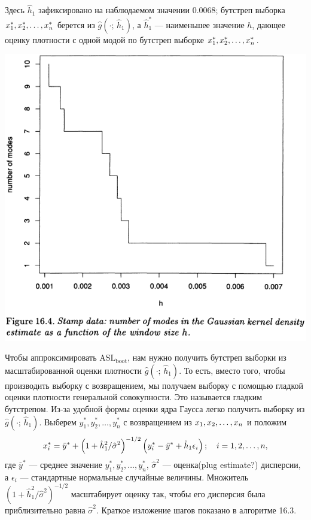 Здесь $\hat{h}_1$ зафиксировано на наблюдаемом значении $0.0068$; бутстреп выборка $x_1^*,x_2^*,\ldots,x_{n}^*$ берется из $\hat{g}(\cdot;\, \hat{h}_1)$, а $\hat{h}^{*}_1$ --- наименьшее значение $h$, дающее оценку плотности с одной модой по бутстреп выборке $x_1^*,x_2^*,\ldots,x_{n}^*$.

\newpage
\noindent
\includegraphics[width=\linewidth]{16/f16.4.png}

Чтобы аппроксимировать $\text{ASL}_{\text{boot}}$, нам нужно получить бутстреп выборки из масштабированной оценки плотности $\hat{g}(\cdot;\, \hat{h}_1)$. То есть, вместо того, чтобы производить выборку с возвращением, мы получаем выборку с помощью гладкой оценки плотности генеральной совокупности. Это называется гладким бутстрепом. Из-за удобной формы оценки ядра Гаусса легко получить выборку из $\hat{g}(\cdot;\, \hat{h}_1)$. Выберем $y^{*}_1, y^{*}_2, \ldots, y^{*}_n$ с возвращением из $x_1,x_2,\ldots,x_{n}$ и положим
\begin{equation}\label{eq16.22}
    x^{*}_i = \bar{y}^{*} + \left(1+\hat{h}^2_1/\hat{\sigma}^2\right)^{-1/2}\left(y^{*}_i - \bar{y}^{*} + \hat{h}_1\epsilon_i\right);\quad i = 1,2,\ldots,n,
\end{equation}
где $\bar{y}^{*}$ --- среднее значение $y^{*}_1, y^{*}_2, \ldots, y^{*}_n$, $\hat{\sigma}^2$ --- оценка(plug estimate?) дисперсии, а $\epsilon_i$ --- стандартные нормальные случайные величины. Множитель $\left(1+\hat{h}^2_1/\hat{\sigma}^2\right)^{-1/2}$ масштабирует оценку так, чтобы его дисперсия была приблизительно равна $\hat{\sigma}^2$. Краткое изложение шагов показано в алгоритме 16.3.

